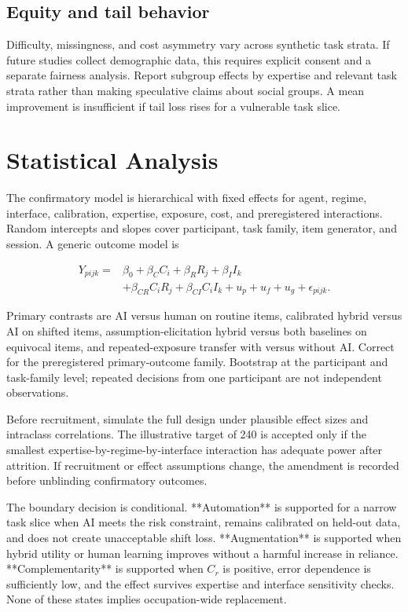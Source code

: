 \documentclass[conference]{IEEEtran}
\begin{document}
\subsection{Equity and tail behavior}

Difficulty, missingness, and cost asymmetry vary across synthetic task strata. If future studies collect demographic data, this requires explicit consent and a separate fairness analysis. Report subgroup effects by expertise and relevant task strata rather than making speculative claims about social groups. A mean improvement is insufficient if tail loss rises for a vulnerable task slice.

\section{Statistical Analysis}

The confirmatory model is hierarchical with fixed effects for agent, regime, interface, calibration, expertise, exposure, cost, and preregistered interactions. Random intercepts and slopes cover participant, task family, item generator, and session. A generic outcome model is

\begin{equation}
\begin{aligned}
Y_{pijk}={}&\beta_0+\beta_C C_i+\beta_R R_j+\beta_I I_k\\
&+\beta_{CR}C_iR_j+\beta_{CI}C_iI_k+u_p+u_f+u_g+\epsilon_{pijk}.
\end{aligned}
\end{equation}

Primary contrasts are AI versus human on routine items, calibrated hybrid versus AI on shifted items, assumption-elicitation hybrid versus both baselines on equivocal items, and repeated-exposure transfer with versus without AI. Correct for the preregistered primary-outcome family. Bootstrap at the participant and task-family level; repeated decisions from one participant are not independent observations.

Before recruitment, simulate the full design under plausible effect sizes and intraclass correlations. The illustrative target of 240 is accepted only if the smallest expertise-by-regime-by-interface interaction has adequate power after attrition. If recruitment or effect assumptions change, the amendment is recorded before unblinding confirmatory outcomes.

The boundary decision is conditional. **Automation** is supported for a narrow task slice when AI meets the risk constraint, remains calibrated on held-out data, and does not create unacceptable shift loss. **Augmentation** is supported when hybrid utility or human learning improves without a harmful increase in reliance. **Complementarity** is supported when $C_r$ is positive, error dependence is sufficiently low, and the effect survives expertise and interface sensitivity checks. None of these states implies occupation-wide replacement.
\end{document}
